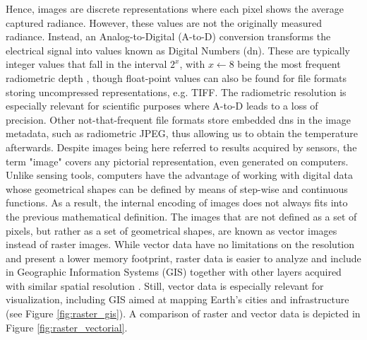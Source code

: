 Hence, images are discrete representations where each pixel shows the average captured radiance. However, these values are not the originally measured radiance. Instead, an Analog-to-Digital (A-to-D) conversion transforms the electrical signal into values known as Digital Numbers (\acrshort{dn}). These are typically integer values that fall in the interval $2^x$, with $x \gets 8$ being the most frequent radiometric depth \cite{navulur_multispectral_2006}, though float-point values can also be found for file formats storing uncompressed representations, e.g. TIFF. The radiometric resolution is especially relevant for scientific purposes where A-to-D leads to a loss of precision. Other not-that-frequent file formats store embedded \acrshort{dn}s in the image metadata, such as radiometric JPEG, thus allowing us to obtain the temperature afterwards. Despite images being here referred to results acquired by sensors, the term "image" covers any pictorial representation, even generated on computers. Unlike sensing tools, computers have the advantage of working with digital data whose geometrical shapes can be defined by means of step-wise and continuous functions. As a result, the internal encoding of images does not always fits into the previous mathematical definition. The images that are not defined as a set of pixels, but rather as a set of geometrical shapes, are known as vector images instead of raster images. While vector data have no limitations on the resolution and present a lower memory footprint, raster data is easier to analyze and include in Geographic Information Systems (GIS) together with other layers acquired with similar spatial resolution \cite{lillesand_remote_2015}. Still, vector data is especially relevant for visualization, including GIS aimed at mapping Earth's cities and infrastructure (see Figure \ref{fig:raster_gis}). A comparison of raster and vector data is depicted in Figure \ref{fig:raster_vectorial}.
